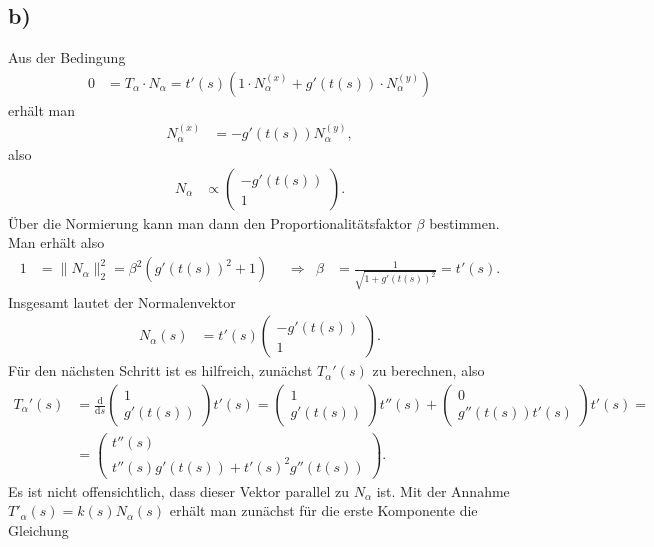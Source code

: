 \documentclass[english, parskip=full]{scrartcl}
\newcommand{\kla}{}
\newcommand{\tecxt}{}
\begin{document}
\subsection*{b)}
Aus der Bedingung
\begin{align}
0&=T_\alpha\cdot N_\alpha=t'(s)\kla\left( 1\cdot N_\alpha^{(x)} + g'(t(s))\cdot N_\alpha^{(y)} \right)
\end{align}
erhält man 
\begin{align}
N_\alpha^{(x)}&=-g'(t(s))N_\alpha^{(y)},
\end{align}
also
\begin{align}
N_\alpha&\propto\begin{pmatrix}
-g'(t(s)) \\ 1
\end{pmatrix}.
\end{align}
Über die Normierung kann man dann den Proportionalitätsfaktor $\beta$ bestimmen.
Man erhält also
\begin{align}
1&=\|N_\alpha\|_2^2=\beta^2\kla\left( g'(t(s))^2+1 \right)&&\Rightarrow&\beta&=\frac{1}{\sqrt{1+g'(t(s))^2}}=t'(s).
\end{align}
Insgesamt lautet der Normalenvektor
\begin{align}
N_\alpha(s)&=t'(s)\begin{pmatrix}
-g'(t(s)) \\ 1
\end{pmatrix}.
\end{align}
Für den nächsten Schritt ist es hilfreich, zunächst $T_\alpha'(s)$ zu berechnen, also
\begin{align}
T_\alpha'(s)&=\frac{\tecxt\text{d}}{\tecxt\text{d}s}\begin{pmatrix}
1 \\ g'(t(s))
\end{pmatrix}t'(s)=\begin{pmatrix}
1 \\ g'(t(s))
\end{pmatrix}t''(s)+\begin{pmatrix}
0 \\ g''(t(s))t'(s)
\end{pmatrix}t'(s)=\\
&=\begin{pmatrix}
t''(s) \\ t''(s)g'(t(s))+t'(s)^2g''(t(s))
\end{pmatrix}.
\end{align}
Es ist nicht offensichtlich, dass dieser Vektor parallel zu $N_\alpha$ ist.
Mit der Annahme $T'_\alpha(s)=k(s)N_\alpha(s)$ erhält man zunächst für die erste Komponente die Gleichung
\end{document}
